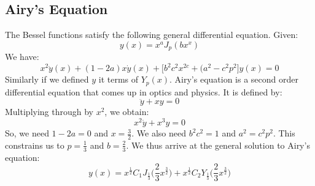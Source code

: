 \documentclass[crop=false,class=book,oneside]{standalone}
\begin{document}
        \subsection{Airy's Equation}
            The Bessel functions satisfy the following
            general differential equation. Given:
            \begin{equation}
                y(x)=x^{a}J_{p}(bx^{x})
            \end{equation}
            We have:
            \begin{equation}
                x^{2}\ddot{y}(x)+(1-2a)x\dot{y}(x)+
                \Big[b^{2}c^{2}x^{2c}+(a^{2}-c^{2}p^{2}\Big]y(x)
                =0
            \end{equation}
            Similarly if we defined $y$ it terms of $Y_{p}(x)$.
            Airy's equation is a second order differential equation
            that comes up in optics and physics. It is defined by:
            \begin{equation}
                \ddot{y}+xy=0
            \end{equation}
            Multiplying through by $x^{2}$, we obtain:
            \begin{equation}
                x^{2}\ddot{y}+x^{3}y=0
            \end{equation}
            So, we need $1-2a=0$ and $x=\frac{3}{2}$. We also need
            $b^{2}c^{2}=1$ and $a^{2}=c^{2}p^{2}$. This constrains
            us to $p=\frac{1}{3}$ and $b=\frac{2}{3}$. We thus
            arrive at the general solution to Airy's equation:
            \begin{equation}
                y(x)=x^{\frac{1}{2}}C_{1}J_{\frac{1}{3}}
                    \Big(\frac{2}{3}x^{\frac{3}{2}}\Big)+
                    x^{\frac{1}{2}}C_{2}Y_{\frac{1}{3}}
                    \Big(\frac{2}{3}x^{\frac{3}{2}}\Big)
            \end{equation}
\end{document}
